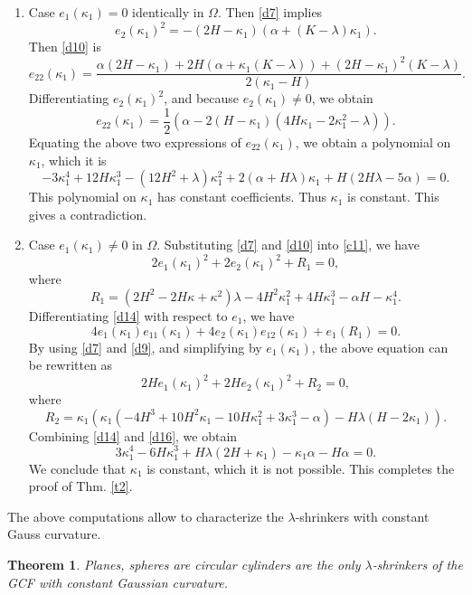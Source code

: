 \documentclass[a4paper,12pt]{amsart}
\newtheorem{theorem}{Theorem}[section]
\theoremstyle{definition}
\begin{document}
\begin{enumerate} 
\item Case  $e_1(\kappa_1)=0$ identically in $\Omega$. Then \eqref{d7}  implies
$$e_2(\kappa_1)^2=-  (2H-\kappa_1)(\alpha+(K-\lambda)\kappa_1).$$
Then \eqref{d10} is 
$$e_{22}(\kappa_1)=\frac{\alpha(2H-\kappa_1) +2H(\alpha+\kappa_1(K-\lambda))+(2H-\kappa_1)^2(K-\lambda)}{2 (\kappa_1-H)}.$$
Differentiating $e_2(\kappa_1)^2$, and because $e_2(\kappa_1)\not=0$, we obtain 
$$e_{22}(\kappa_1)=\frac{1}{2}\left(\alpha-2 (H-\kappa_1) \left(4 H \kappa_1-2 \kappa_1^2-\lambda \right)\right).$$
Equating the above two expressions of $e_{22}(\kappa_1)$, we obtain a polynomial on $\kappa_1$, which it is
 $$-3\kappa_1^4+12H \kappa_1^3-(12H^2+\lambda)\kappa_1^2+2(\alpha+H\lambda)\kappa_1+H(2H\lambda-5\alpha)=0.$$
 This polynomial on $\kappa_1$ has constant coefficients. Thus $\kappa_1$ is constant. This gives  a contradiction.  
 
 

\item Case  $e_1(\kappa_1)\not=0$   in $\Omega$.  Substituting \eqref{d7} and \eqref{d10} into \eqref{c11}, we have
\begin{equation}\label{d14}
    2e_1(\kappa_1)^2+2e_2(\kappa_1)^2+R_1=0,
\end{equation}
where
$$R_1=(2H^2-2H\kappa+\kappa^2)\lambda-4 H^2 \kappa_1^2+4 H \kappa_1^3-\alpha H-\kappa_1^4.$$
Differentiating \eqref{d14} with respect to $e_1$, we have
$$
4e_1(\kappa_1)e_{11}(\kappa_1)+4e_2(\kappa_1)e_{12}(\kappa_1)+e_1(R_1)=0.
$$
By using \eqref{d7} and \eqref{d9}, and simplifying by $e_1(\kappa_1)$,  the above equation   can be rewritten as
\begin{equation}\label{d16}
2H e_1(\kappa_1)^2+2H e_2(\kappa_1)^2+R_2=0,
\end{equation}
where
$$R_2=\kappa_1 \left(\kappa_1 \left(-4 H^3+10 H^2 \kappa_1-10 H \kappa_1^2+3 \kappa_1^3-\alpha\right)-H \lambda  (H-2 \kappa_1)\right).$$
Combining \eqref{d14}  and \eqref{d16}, we obtain  
$$
3 \kappa_1^4-6 H \kappa_1^3+H \lambda  (2 H+\kappa_1) -\kappa_1\alpha -H\alpha=0.$$ 
We conclude that  $\kappa_1$ is constant, which it is not possible. This completes   the proof of  Thm. \ref{t2}. 


\end{enumerate}

The above computations allow to characterize the $\lambda$-shrinkers with constant Gauss curvature.


\begin{theorem} Planes, spheres are circular cylinders are the only  $\lambda$-shrinkers of the GCF with constant Gaussian curvature.
\end{theorem}
\end{document}
